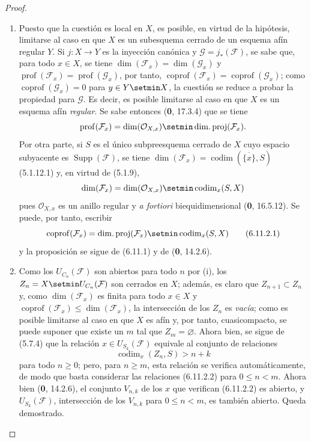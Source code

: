 \begin{proof}
\begin{enumerate}
\item[(i)] Puesto que la cuestión es local en $X$, es posible, en virtud de
la hipótesis, limitarse al caso en que $X$ es un subesquema cerrado de un esquema
afín regular $Y$. Si $j:X\to Y$ es la inyección canónica y
$\mathcal G=j_*(\mathcal F)$, se sabe que, para todo $x\in X$, se tiene
$\dim(\mathcal F_x)=\dim(\mathcal G_x)$ y
$\operatorname{prof}(\mathcal F_x)=\operatorname{prof}(\mathcal G_x)$,
por tanto, $\operatorname{coprof}(\mathcal F_x)=
\operatorname{coprof}(\mathcal G_x)$; como
$\operatorname{coprof}(\mathcal G_x)=0$ para $y\in Y\setmin X$, la cuestión se reduce a
probar la propiedad para $\mathcal G$. Es decir, es posible limitarse al
caso en que $X$ es un esquema afín \emph{regular}. Se sabe entonces (\textbf 0, 17.3.4) que
se tiene
\[
\operatorname{prof}(\mathcal F_x)=\dim(\mathcal O_{X,x})\setmin
\operatorname{dim.proj}(\mathcal F_x).
\]
Por otra parte, si $S$ es el único subpreesquema cerrado de $X$ cuyo
espacio subyacente es $\operatorname{Supp}(\mathcal F)$, se tiene
$\dim(\mathcal F_x)=\operatorname{codim}(\overline{\{x\}},S)$ (5.1.12.1) y, en
virtud de (5.1.9),
\[
\dim(\mathcal F_x)=\dim(\mathcal O_{X,x})\setmin\operatorname{codim}_x(S,X)
\]
pues $\mathcal O_{X,x}$ es un anillo regular y \emph{a fortiori}
biequidimensional (\textbf 0, 16.5.12). Se puede, por tanto, escribir
\begin{equation}
\operatorname{coprof}(\mathcal F_x)=
\operatorname{dim.proj}(\mathcal F_x)\setmin\operatorname{codim}_x(S,X)
\tag{6.11.2.1}\label{IV.2.s6.11.2.1-fr}
\end{equation}
y la proposición se sigue de (6.11.1) y de (\textbf 0, 14.2.6).

\item[(ii)] Como los $U_{C_n}(\mathcal F)$ son abiertos para todo $n$ por
(i), los $Z_n=X\setmin U_{C_n}(\mathcal F)$ son cerrados en $X$; además, es
claro que $Z_{n+1}\subset Z_n$ y, como $\dim(\mathcal F_x)$ es finita
para todo $x\in X$ y
$\operatorname{coprof}(\mathcal F_x)\leq\dim(\mathcal F_x)$,
la intersección de los $Z_n$ es \emph{vacía}; como es posible limitarse al caso en que $X$
es afín y, por tanto, cuasicompacto, se puede suponer que existe un $m$
tal que $Z_m=\varnothing$. Ahora bien, se sigue de (5.7.4) que la relación
$x\in U_{S_k}(\mathcal F)$ equivale al conjunto de relaciones
\begin{equation}
\operatorname{codim}_x(Z_n,S)>n+k
\tag{6.11.2.2}\label{IV.2.s6.11.2.2-fr}
\end{equation}
para todo $n\geq0$; pero, para $n\geq m$, esta relación se verifica
automáticamente, de modo que basta considerar las relaciones (6.11.2.2)
para $0\leq n<m$. Ahora bien (\textbf 0, 14.2.6), el conjunto $V_{n,k}$ de los $x$ que verifican
(6.11.2.2) es abierto, y $U_{S_k}(\mathcal F)$, intersección de los $V_{n,k}$
para $0\leq n<m$, es también abierto. Queda demostrado.
\end{enumerate}
\end{proof}

